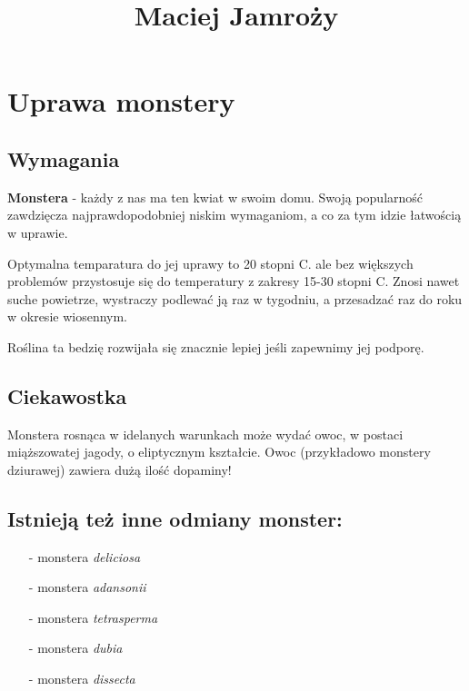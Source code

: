 \begin{center}
\begin{LARGE}
\title{\textbf{Maciej Jamroży}}
\end{LARGE}
\end{center}
\section{Uprawa monstery}

\subsection{Wymagania}
\begin{justify}
\textbf{Monstera} - każdy z nas ma ten kwiat w swoim domu. Swoją popularność zawdzięcza najprawdopodobniej niskim wymaganiom, a co za tym idzie łatwością w uprawie.

Optymalna temparatura do jej uprawy to 20 stopni C. ale bez większych problemów przystosuje się do temperatury z zakresy 15-30 stopni C. Znosi nawet suche powietrze, wystraczy podlewać ją raz w tygodniu, a przesadzać raz do roku w okresie wiosennym.

Roślina ta bedzię rozwijała się znacznie lepiej jeśli zapewnimy jej podporę.
\end{justify}

\subsection{Ciekawostka}
Monstera rosnąca w idelanych warunkach może wydać owoc, w postaci miąższowatej jagody, o eliptycznym kształcie. Owoc (przykładowo monstery dziurawej) zawiera dużą ilość dopaminy!

\subsection{Istnieją też inne odmiany monster:}
    \begin{itemize}
        \item[-] monstera \emph{deliciosa}
        \item[-]monstera \emph{adansonii}
        \item[-]monstera \emph{tetrasperma}
        \item[-]monstera \emph{dubia}
        \item[-]monstera \emph{dissecta}
    \end{itemize}
